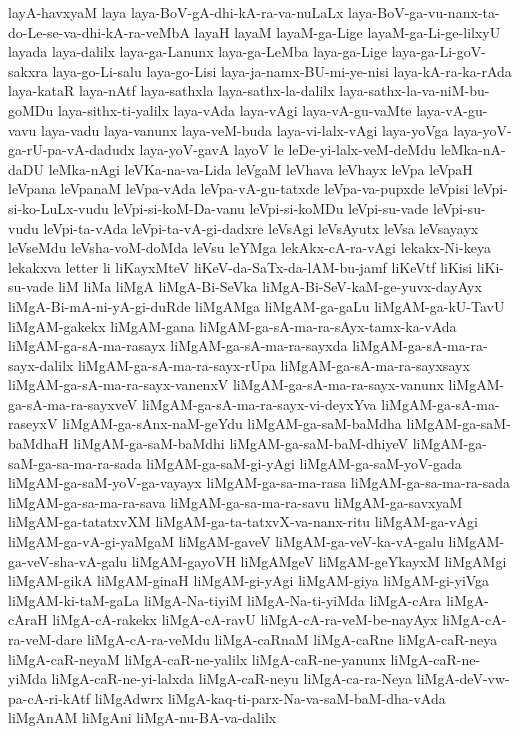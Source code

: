 {layA-havxyaM
laya
laya-BoV-gA-dhi-kA-ra-va-nuLaLx
laya-BoV-ga-vu-nanx-ta-do-Le-se-va-dhi-kA-ra-veMbA
layaH
layaM
layaM-ga-Lige
layaM-ga-Li-ge-lilxyU
layada
laya-dalilx
laya-ga-Lanunx
laya-ga-LeMba
laya-ga-Lige
laya-ga-Li-goV-sakxra
laya-go-Li-salu
laya-go-Lisi
laya-ja-namx-BU-mi-ye-nisi
laya-kA-ra-ka-rAda
laya-kataR
laya-nAtf
laya-sathxla
laya-sathx-la-dalilx
laya-sathx-la-va-niM-bu-goMDu
laya-sithx-ti-yalilx
laya-vAda
laya-vAgi
laya-vA-gu-vaMte
laya-vA-gu-vavu
laya-vadu
laya-vanunx
laya-veM-buda
laya-vi-lalx-vAgi
laya-yoVga
laya-yoV-ga-rU-pa-vA-dadudx
laya-yoV-gavA
layoV
le
leDe-yi-lalx-veM-deMdu
leMka-nA-daDU
leMka-nAgi
leVKa-na-va-Lida
leVgaM
leVhava
leVhayx
leVpa
leVpaH
leVpana
leVpanaM
leVpa-vAda
leVpa-vA-gu-tatxde
leVpa-va-pupxde
leVpisi
leVpi-si-ko-LuLx-vudu
leVpi-si-koM-Da-vanu
leVpi-si-koMDu
leVpi-su-vade
leVpi-su-vudu
leVpi-ta-vAda
leVpi-ta-vA-gi-dadxre
leVsAgi
leVsAyutx
leVsa
leVsayayx
leVseMdu
leVsha-voM-doMda
leVsu
leYMga
lekAkx-cA-ra-vAgi
lekakx-Ni-keya
lekakxva
letter
li
liKayxMteV
liKeV-da-SaTx-da-lAM-bu-jamf
liKeVtf
liKisi
liKi-su-vade
liM
liMa
liMgA
liMgA-Bi-SeVka
liMgA-Bi-SeV-kaM-ge-yuvx-dayAyx
liMgA-Bi-mA-ni-yA-gi-duRde
liMgAMga
liMgAM-ga-gaLu
liMgAM-ga-kU-TavU
liMgAM-gakekx
liMgAM-gana
liMgAM-ga-sA-ma-ra-sAyx-tamx-ka-vAda
liMgAM-ga-sA-ma-rasayx
liMgAM-ga-sA-ma-ra-sayxda
liMgAM-ga-sA-ma-ra-sayx-dalilx
liMgAM-ga-sA-ma-ra-sayx-rUpa
liMgAM-ga-sA-ma-ra-sayxsayx
liMgAM-ga-sA-ma-ra-sayx-vanenxV
liMgAM-ga-sA-ma-ra-sayx-vanunx
liMgAM-ga-sA-ma-ra-sayxveV
liMgAM-ga-sA-ma-ra-sayx-vi-deyxYva
liMgAM-ga-sA-ma-raseyxV
liMgAM-ga-sAnx-naM-geYdu
liMgAM-ga-saM-baMdha
liMgAM-ga-saM-baMdhaH
liMgAM-ga-saM-baMdhi
liMgAM-ga-saM-baM-dhiyeV
liMgAM-ga-saM-ga-sa-ma-ra-sada
liMgAM-ga-saM-gi-yAgi
liMgAM-ga-saM-yoV-gada
liMgAM-ga-saM-yoV-ga-vayayx
liMgAM-ga-sa-ma-rasa
liMgAM-ga-sa-ma-ra-sada
liMgAM-ga-sa-ma-ra-sava
liMgAM-ga-sa-ma-ra-savu
liMgAM-ga-savxyaM
liMgAM-ga-tatatxvXM
liMgAM-ga-ta-tatxvX-va-nanx-ritu
liMgAM-ga-vAgi
liMgAM-ga-vA-gi-yaMgaM
liMgAM-gaveV
liMgAM-ga-veV-ka-vA-galu
liMgAM-ga-veV-sha-vA-galu
liMgAM-gayoVH
liMgAMgeV
liMgAM-geYkayxM
liMgAMgi
liMgAM-gikA
liMgAM-ginaH
liMgAM-gi-yAgi
liMgAM-giya
liMgAM-gi-yiVga
liMgAM-ki-taM-gaLa
liMgA-Na-tiyiM
liMgA-Na-ti-yiMda
liMgA-cAra
liMgA-cAraH
liMgA-cA-rakekx
liMgA-cA-ravU
liMgA-cA-ra-veM-be-nayAyx
liMgA-cA-ra-veM-dare
liMgA-cA-ra-veMdu
liMgA-caRnaM
liMgA-caRne
liMgA-caR-neya
liMgA-caR-neyaM
liMgA-caR-ne-yalilx
liMgA-caR-ne-yanunx
liMgA-caR-ne-yiMda
liMgA-caR-ne-yi-lalxda
liMgA-caR-neyu
liMgA-ca-ra-Neya
liMgA-deV-vw-pa-cA-ri-kAtf
liMgAdwrx
liMgA-kaq-ti-parx-Na-va-saM-baM-dha-vAda
liMgAnAM
liMgAni
liMgA-nu-BA-va-dalilx
}
